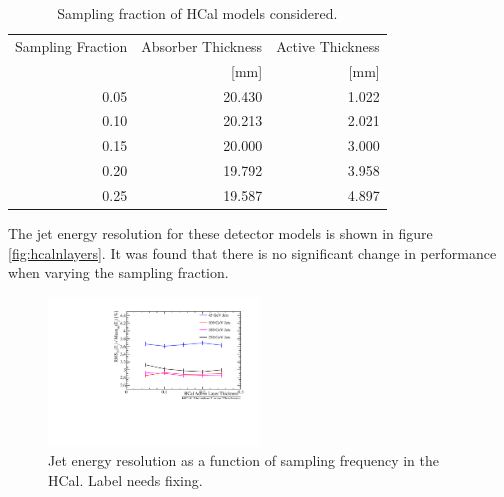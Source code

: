 \begin{table}[h!]
\centering
\begin{tabular}{ r r r }
\hline
Sampling Fraction & Absorber Thickness & Active Thickness \\
 & [mm] & [mm] \\
\hline
0.05 & 20.430 & 1.022 \\ 
0.10 & 20.213 & 2.021 \\
0.15 & 20.000 & 3.000 \\
0.20 & 19.792 & 3.958 \\
0.25 & 19.587 & 4.897 \\
\hline
\end{tabular}
\caption[Sampling fraction of HCal models considered.]{Sampling fraction of HCal models considered.}
\label{table:hcalsamplingfraction}
\end{table}

The jet energy resolution for these detector models is shown in figure \ref{fig:hcalnlayers}.  It was found that there is no significant change in performance when varying the sampling fraction.  

\begin{figure}
\centering
\includegraphics[width=0.5\textwidth]{OptimisationStudies/Plots/JetEnergyResolutions/JER_vs_SamplingFractionInTheHCal.pdf}
\caption[Jet energy resolution as a function of sampling frequency in the HCal.]{Jet energy resolution as a function of sampling frequency in the HCal.  Label needs fixing.}
\label{fig:hcalsamplingfraction}
\end{figure}


